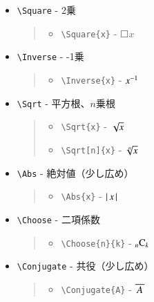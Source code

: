 \documentclass[oneside,10pt,a4paper]{jsarticle}
\begin{document}
  \begin{itemize}
    \item \verb|\Square| - 2乗
      \begin{quote}
        \Example
        \begin{itemize}
          \item \verb|\Square{x}| - $\Square{x}$
        \end{itemize}
      \end{quote}
    \item \verb|\Inverse| - -1乗
      \begin{quote}
        \Example
        \begin{itemize}
          \item \verb|\Inverse{x}| - ${x}^{-1}$
        \end{itemize}
      \end{quote}
    \item \verb|\Sqrt| - 平方根、$n$乗根
      \begin{quote}
        \Example
        \begin{itemize}
          \item \verb|\Sqrt{x}| - $\Sqrt{x}$
          \item \verb|\Sqrt[n]{x}| - $\Sqrt[n]{x}$
        \end{itemize}
      \end{quote}
    \item \verb|\Abs| - 絶対値（少し広め）
      \begin{quote}
        \Example
        \begin{itemize}
          \item \verb|\Abs{x}| - $\left| \, x \, \right|$
        \end{itemize}
      \end{quote}
    \item \verb|\Choose| - 二項係数
      \begin{quote}
        \Example
        \begin{itemize}
          \item \verb|\Choose{n}{k}| - ${}_{n} \mathrm{C}_{k}$
        \end{itemize}
      \end{quote}
    \item \verb|\Conjugate| - 共役（少し広め）
      \begin{quote}
        \Example
        \begin{itemize}
          \item \verb|\Conjugate{A}| - $\overline{ \, A \, }$

\end{itemize}
\end{quote}
\end{itemize}
\end{document}
